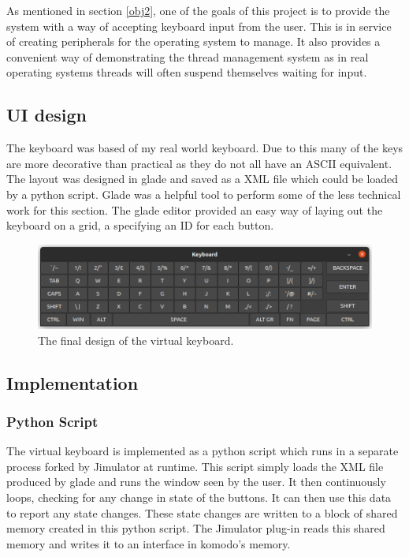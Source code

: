 \label{chap:virtualKeyboard}
As mentioned in section \ref{obj2}, one of the goals of this project is to provide the system with a way of accepting keyboard input from the user. This is in service of creating peripherals for the operating system to manage. It also provides a convenient way of demonstrating the thread management system as in real operating systems threads will often suspend themselves waiting for input.
\subsection{UI design}
The keyboard was based of my real world keyboard. Due to this many of the keys are more decorative than practical as they do not all have an ASCII \cite{ascii} equivalent. The layout was designed in glade \cite{glade} and saved as a XML file which could be loaded by a python script. Glade was a helpful tool to perform some of the less technical work for this section. The glade editor provided an easy way of laying out the keyboard on a grid, a specifying an ID for each button. 


\begin{figure}[ht!]
	\includegraphics[width=\linewidth]{figures/keyboard.png}
	\caption{The final design of the virtual keyboard.}
	\label{fig:keyboard}
\end{figure} 




\subsection{Implementation}
\subsubsection{Python Script}
The virtual keyboard is implemented as a python \cite{python} script which runs in a separate process forked by Jimulator at runtime. This script simply loads the XML file produced by glade and runs the window seen by the user. It then continuously loops, checking for any change in state of the buttons. It can then use this data to report any state changes.  These state changes are written to a block of shared memory created in this python script. The Jimulator plug-in reads this shared memory and writes it to an interface in komodo's memory.
